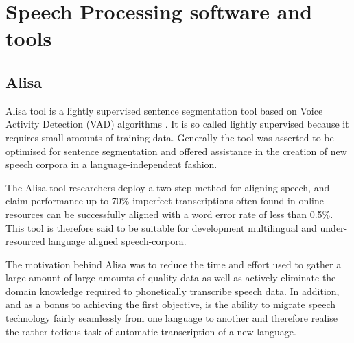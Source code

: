 \section{Speech Processing software and tools}
\subsection{Alisa}\label{c3sec_alisa}
Alisa tool is a lightly supervised sentence segmentation tool based on Voice Activity Detection (VAD) algorithms \citep{stan2016alisa}.  It is so called lightly supervised because it requires small amounts of training data.  Generally the tool was asserted to be optimised for sentence segmentation and offered assistance in the creation of new speech corpora in a language-independent fashion. 

The Alisa tool researchers deploy a two-step method for aligning speech, and claim performance up to 70\% imperfect transcriptions often found in online resources can be successfully aligned with a word error rate of less than 0.5\%.  This tool is therefore said to be suitable for development multilingual and under-resourced language aligned speech-corpora.

The motivation behind Alisa was to reduce the time and effort used to gather a large amount of large amounts of quality data as well as actively eliminate the domain knowledge required to phonetically transcribe speech data.  In addition, and as a bonus to achieving the first objective, is the ability to migrate speech technology fairly seamlessly from one language to another and therefore realise the rather tedious task of automatic transcription of a new language.

